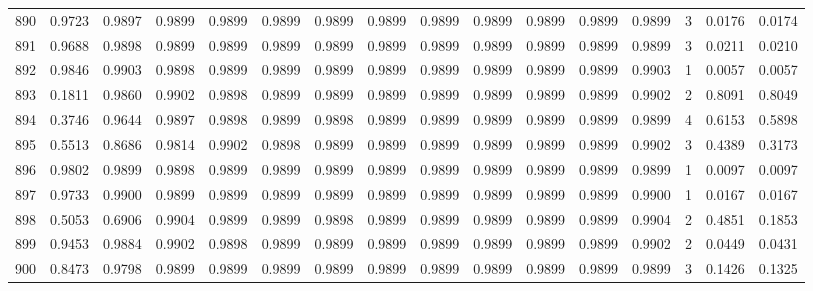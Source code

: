 \begin{tabular}{lrrrrrrrrrrrrrrr}
890 &      0.9723 &  0.9897 &  0.9899 &  0.9899 &  0.9899 &  0.9899 &  0.9899 &  0.9899 &  0.9899 &  0.9899 &   0.9899 &     0.9899 &      3 &                    0.0176 &                     0.0174 \\
891 &      0.9688 &  0.9898 &  0.9899 &  0.9899 &  0.9899 &  0.9899 &  0.9899 &  0.9899 &  0.9899 &  0.9899 &   0.9899 &     0.9899 &      3 &                    0.0211 &                     0.0210 \\
892 &      0.9846 &  0.9903 &  0.9898 &  0.9899 &  0.9899 &  0.9899 &  0.9899 &  0.9899 &  0.9899 &  0.9899 &   0.9899 &     0.9903 &      1 &                    0.0057 &                     0.0057 \\
893 &      0.1811 &  0.9860 &  0.9902 &  0.9898 &  0.9899 &  0.9899 &  0.9899 &  0.9899 &  0.9899 &  0.9899 &   0.9899 &     0.9902 &      2 &                    0.8091 &                     0.8049 \\
894 &      0.3746 &  0.9644 &  0.9897 &  0.9898 &  0.9899 &  0.9898 &  0.9899 &  0.9899 &  0.9899 &  0.9899 &   0.9899 &     0.9899 &      4 &                    0.6153 &                     0.5898 \\
895 &      0.5513 &  0.8686 &  0.9814 &  0.9902 &  0.9898 &  0.9899 &  0.9899 &  0.9899 &  0.9899 &  0.9899 &   0.9899 &     0.9902 &      3 &                    0.4389 &                     0.3173 \\
896 &      0.9802 &  0.9899 &  0.9898 &  0.9899 &  0.9899 &  0.9899 &  0.9899 &  0.9899 &  0.9899 &  0.9899 &   0.9899 &     0.9899 &      1 &                    0.0097 &                     0.0097 \\
897 &      0.9733 &  0.9900 &  0.9899 &  0.9899 &  0.9899 &  0.9899 &  0.9899 &  0.9899 &  0.9899 &  0.9899 &   0.9899 &     0.9900 &      1 &                    0.0167 &                     0.0167 \\
898 &      0.5053 &  0.6906 &  0.9904 &  0.9899 &  0.9899 &  0.9898 &  0.9899 &  0.9899 &  0.9899 &  0.9899 &   0.9899 &     0.9904 &      2 &                    0.4851 &                     0.1853 \\
899 &      0.9453 &  0.9884 &  0.9902 &  0.9898 &  0.9899 &  0.9899 &  0.9899 &  0.9899 &  0.9899 &  0.9899 &   0.9899 &     0.9902 &      2 &                    0.0449 &                     0.0431 \\
900 &      0.8473 &  0.9798 &  0.9899 &  0.9899 &  0.9899 &  0.9899 &  0.9899 &  0.9899 &  0.9899 &  0.9899 &   0.9899 &     0.9899 &      3 &                    0.1426 &                     0.1325 \\

\end{tabular}
